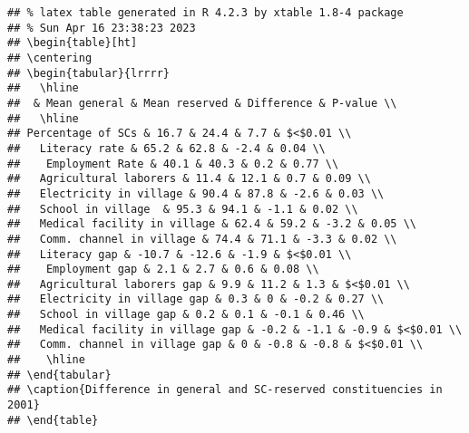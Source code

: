 \documentclass[
]{article}
\begin{document}
\begin{verbatim}
## % latex table generated in R 4.2.3 by xtable 1.8-4 package
## % Sun Apr 16 23:38:23 2023
## \begin{table}[ht]
## \centering
## \begin{tabular}{lrrrr}
##   \hline
##  & Mean general & Mean reserved & Difference & P-value \\ 
##   \hline
## Percentage of SCs & 16.7 & 24.4 & 7.7 & $<$0.01 \\ 
##   Literacy rate & 65.2 & 62.8 & -2.4 & 0.04 \\ 
##    Employment Rate & 40.1 & 40.3 & 0.2 & 0.77 \\ 
##   Agricultural laborers & 11.4 & 12.1 & 0.7 & 0.09 \\ 
##   Electricity in village & 90.4 & 87.8 & -2.6 & 0.03 \\ 
##   School in village  & 95.3 & 94.1 & -1.1 & 0.02 \\ 
##   Medical facility in village & 62.4 & 59.2 & -3.2 & 0.05 \\ 
##   Comm. channel in village & 74.4 & 71.1 & -3.3 & 0.02 \\ 
##   Literacy gap & -10.7 & -12.6 & -1.9 & $<$0.01 \\ 
##    Employment gap & 2.1 & 2.7 & 0.6 & 0.08 \\ 
##   Agricultural laborers gap & 9.9 & 11.2 & 1.3 & $<$0.01 \\ 
##   Electricity in village gap & 0.3 & 0 & -0.2 & 0.27 \\ 
##   School in village gap & 0.2 & 0.1 & -0.1 & 0.46 \\ 
##   Medical facility in village gap & -0.2 & -1.1 & -0.9 & $<$0.01 \\ 
##   Comm. channel in village gap & 0 & -0.8 & -0.8 & $<$0.01 \\ 
##    \hline
## \end{tabular}
## \caption{Difference in general and SC-reserved constituencies in 2001} 
## \end{table}
\end{verbatim}
\end{document}
